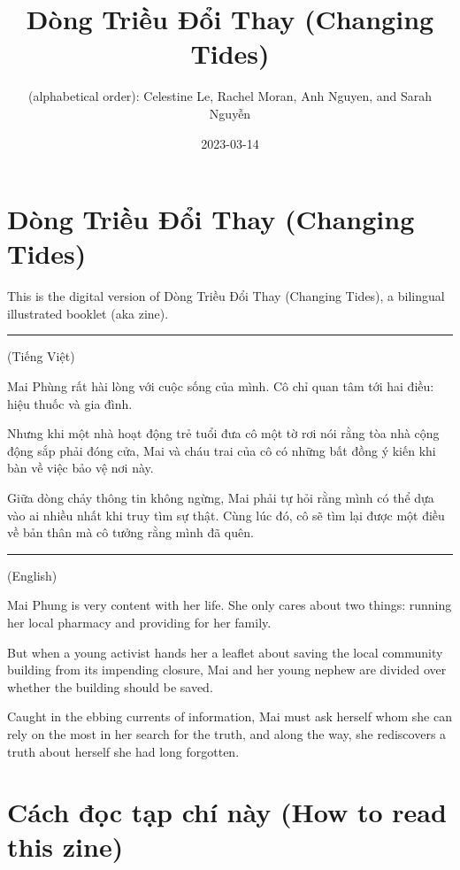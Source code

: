 \documentclass[
]{book}
\title{Dòng Triều Đổi Thay (Changing Tides)}
\author{(alphabetical order): Celestine Le, Rachel Moran, Anh Nguyen, and Sarah Nguyễn}
\date{2023-03-14}
\begin{document}
\maketitle

{
\setcounter{tocdepth}{1}
\tableofcontents
}
\hypertarget{duxf2ng-triux1ec1u-ux111ux1ed5i-thay-changing-tides}{%
\chapter{Dòng Triều Đổi Thay (Changing Tides)}\label{duxf2ng-triux1ec1u-ux111ux1ed5i-thay-changing-tides}}

This is the digital version of Dòng Triều Đổi Thay (Changing Tides), a bilingual illustrated booklet (aka zine).

\begin{center}\rule{0.5\linewidth}{0.5pt}\end{center}

(Tiếng Việt)

Mai Phùng rất hài lòng với cuộc sống của mình. Cô chỉ quan tâm tới hai điều: hiệu thuốc và gia đình.

Nhưng khi một nhà hoạt động trẻ tuổi đưa cô một tờ rơi nói rằng tòa nhà cộng động sắp phải đóng cửa, Mai và cháu trai của cô có những bất đồng ý kiến khi bàn về việc bảo vệ nơi này.

Giữa dòng chảy thông tin không ngừng, Mai phải tự hỏi rằng mình có thể dựa vào ai nhiều nhất khi truy tìm sự thật. Cùng lúc đó, cô sẽ tìm lại được một điều về bản thân mà cô tưởng rằng mình đã quên.

\begin{center}\rule{0.5\linewidth}{0.5pt}\end{center}

(English)

Mai Phung is very content with her life. She only cares about two things: running her local pharmacy and providing for her family.

But when a young activist hands her a leaflet about saving the local community building from its impending closure, Mai and her young nephew are divided over whether the building should be saved.

Caught in the ebbing currents of information, Mai must ask herself whom she can rely on the most in her search for the truth, and along the way, she rediscovers a truth about herself she had long forgotten.

\hypertarget{cuxe1ch-ux111ux1ecdc-tux1ea1p-chuxed-nuxe0y-how-to-read-this-zine}{%
\chapter{Cách đọc tạp chí này (How to read this zine)}\label{cuxe1ch-ux111ux1ecdc-tux1ea1p-chuxed-nuxe0y-how-to-read-this-zine}}
\end{document}
